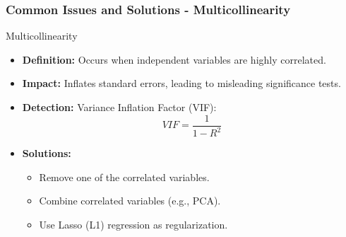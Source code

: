 \documentclass[aspectratio=169]{beamer}
\begin{document}
\begin{frame}[fragile]
    \frametitle{Common Issues and Solutions - Multicollinearity}
    \begin{block}{Multicollinearity}
        \begin{itemize}
            \item \textbf{Definition:} Occurs when independent variables are highly correlated.
            \item \textbf{Impact:} Inflates standard errors, leading to misleading significance tests.
            \item \textbf{Detection:} Variance Inflation Factor (VIF):
            \begin{equation}
                VIF = \frac{1}{1 - R^2}
            \end{equation}
            \item \textbf{Solutions:}
            \begin{itemize}
                \item Remove one of the correlated variables.
                \item Combine correlated variables (e.g., PCA).
                \item Use Lasso (L1) regression as regularization.
            \end{itemize}
        \end{itemize}
    \end{block}
\end{frame}
\end{document}
